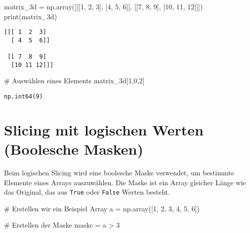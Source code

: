 \documentclass[
  letterpaper,
  DIV=11,
  numbers=noendperiod]{scrreprt}
\newenvironment{Shaded}{\begin{snugshade}}{\end{snugshade}}
\newcommand{\BuiltInTok}[1]{\textcolor[rgb]{0.00,0.23,0.31}{#1}}
\newcommand{\CommentTok}[1]{\textcolor[rgb]{0.37,0.37,0.37}{#1}}
\newcommand{\DecValTok}[1]{\textcolor[rgb]{0.68,0.00,0.00}{#1}}
\newcommand{\NormalTok}[1]{\textcolor[rgb]{0.00,0.23,0.31}{#1}}
\newcommand{\OperatorTok}[1]{\textcolor[rgb]{0.37,0.37,0.37}{#1}}
\begin{document}
\begin{tcolorbox}
\begin{Shaded}
\begin{Highlighting}[]
\NormalTok{matrix\_3d }\OperatorTok{=}\NormalTok{ np.array([[[}\DecValTok{1}\NormalTok{, }\DecValTok{2}\NormalTok{, }\DecValTok{3}\NormalTok{], [}\DecValTok{4}\NormalTok{, }\DecValTok{5}\NormalTok{, }\DecValTok{6}\NormalTok{]], [[}\DecValTok{7}\NormalTok{, }\DecValTok{8}\NormalTok{, }\DecValTok{9}\NormalTok{], [}\DecValTok{10}\NormalTok{, }\DecValTok{11}\NormalTok{, }\DecValTok{12}\NormalTok{]]])}
\BuiltInTok{print}\NormalTok{(matrix\_3d)}
\end{Highlighting}
\end{Shaded}

\begin{verbatim}
[[[ 1  2  3]
  [ 4  5  6]]

 [[ 7  8  9]
  [10 11 12]]]
\end{verbatim}

\begin{Shaded}
\begin{Highlighting}[]
\CommentTok{\# Auswählen eines Elements}
\NormalTok{matrix\_3d[}\DecValTok{1}\NormalTok{,}\DecValTok{0}\NormalTok{,}\DecValTok{2}\NormalTok{]}
\end{Highlighting}
\end{Shaded}

\begin{verbatim}
np.int64(9)
\end{verbatim}

\section{Slicing mit logischen Werten (Boolesche
Masken)}\label{slicing-mit-logischen-werten-boolesche-masken}

Beim logischen Slicing wird eine boolesche Maske verwendet, um bestimmte
Elemente eines Arrays auszuwählen. Die Maske ist ein Array gleicher
Länge wie das Original, das aus \texttt{True} oder \texttt{False} Werten
besteht.

\begin{Shaded}
\begin{Highlighting}[]
\CommentTok{\# Erstellen wir ein Beispiel Array}
\NormalTok{a }\OperatorTok{=}\NormalTok{ np.array([}\DecValTok{1}\NormalTok{, }\DecValTok{2}\NormalTok{, }\DecValTok{3}\NormalTok{, }\DecValTok{4}\NormalTok{, }\DecValTok{5}\NormalTok{, }\DecValTok{6}\NormalTok{])}

\CommentTok{\# Erstellen der Maske}
\NormalTok{maske }\OperatorTok{=}\NormalTok{ a }\OperatorTok{\textgreater{}} \DecValTok{3}


\end{Highlighting}
\end{Shaded}
\end{tcolorbox}
\end{document}
